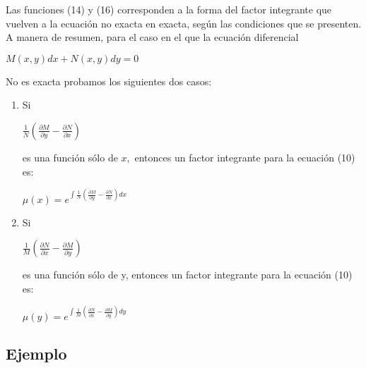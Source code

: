 \documentclass[l etterpaper,11pt]{article}
\begin{document}
Las funciones (14) y (16) corresponden a la forma del factor integrante que vuelven a la ecuación no exacta en exacta, según las condiciones que se presenten.
A manera de resumen, para el caso en el que la ecuación diferencial
\begin{center}

$M(x,y)dx+N(x,y)dy=0$\\
\end{center}


No es exacta probamos los siguientes dos casos:	
\begin{enumerate}

\item Si
\begin{center}

$\frac{1}{N}(\frac{\partial M}{\partial y}-\frac{\partial N}{\partial x})$\\
\end{center}

es una función sólo de $ x, $ entonces un factor integrante para la ecuación (10) es:

\begin{center}

$\mu\left(x\right)=e^{\int{\frac{1}{N}\left(\frac{\partial M}{\partial y}-\frac{\partial N}{\partial x}\right)dx}}$\\
\end{center}

\item Si
\begin{center}
$\frac{1}{M}(\frac{\partial N}{\partial x}-\frac{\partial M}{\partial y})$\\
\end{center}

es una función sólo de y, entonces un factor integrante para la ecuación (10) es:
\begin{center}

$\mu\left(y\right)=e^{\int{\frac{1}{M}\left(\frac{\partial N}{\partial x}-\frac{\partial M}{\partial y}\right)dy}}$\\
\end{center}

\end{enumerate}





\subsection{Ejemplo}
\end{document}
